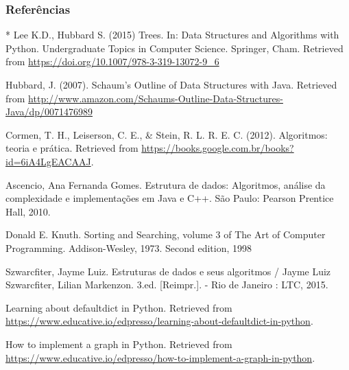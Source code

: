 \documentclass[xcolor=table]{beamer}
\begin{document}
\begin{frame}[t,allowframebreaks]
  \frametitle{Referências}
  \begin{thebibliography}{*}
     Lee K.D., Hubbard S. (2015) Trees. In: Data Structures and Algorithms with Python. Undergraduate Topics in Computer Science. Springer, Cham. Retrieved from \url{https://doi.org/10.1007/978-3-319-13072-9_6}

     Hubbard, J. (2007). Schaum's Outline of Data Structures with Java. Retrieved from \url{http://www.amazon.com/Schaums-Outline-Data-Structures-Java/dp/0071476989}

     Cormen, T. H., Leiserson, C. E., \& Stein, R. L. R. E. C. (2012). Algoritmos: teoria e prática. Retrieved from \url{https://books.google.com.br/books?id=6iA4LgEACAAJ}.

     Ascencio, Ana Fernanda Gomes. Estrutura de dados: Algoritmos, análise da complexidade e implementações em Java e C++. São Paulo: Pearson Prentice Hall, 2010.

     Donald E. Knuth. Sorting and Searching, volume 3 of The Art of Computer Programming. Addison-Wesley, 1973. Second edition, 1998

     Szwarcfiter, Jayme Luiz. Estruturas de dados e seus algoritmos / Jayme Luiz Szwarcfiter, Lilian Markenzon. 3.ed. [Reimpr.]. - Rio de Janeiro : LTC, 2015.

     Learning about defaultdict in Python. Retrieved from \url{https://www.educative.io/edpresso/learning-about-defaultdict-in-python}.

     How to implement a graph in Python. Retrieved from \url{https://www.educative.io/edpresso/how-to-implement-a-graph-in-python}.
  \end{thebibliography}
\end{frame}

\section{}

\begin{frame}
  \titlepage
\end{frame}
\end{document}
